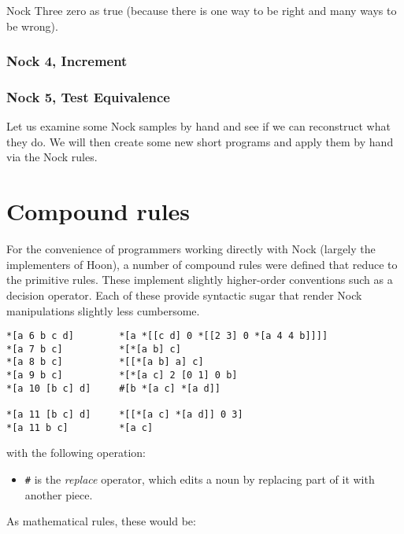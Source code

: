Nock Three
zero as true (because there is one way to be right and many ways to be wrong).

\subsubsection[Nock 4]{Nock 4, Increment}
\subsubsection[Nock 5]{Nock 5, Test Equivalence}

Let us examine some Nock samples by hand and see if we can reconstruct what they do.  We will then create some new short programs and apply them by hand via the Nock rules.


\section{Compound rules}

For the convenience of programmers working directly with Nock (largely the implementers of Hoon), a number of compound rules were defined that reduce to the primitive rules.  These implement slightly higher-order conventions such as a decision operator.  Each of these provide syntactic sugar that render Nock manipulations slightly less cumbersome.

\begin{lstlisting}[style=nonumbers]
*[a 6 b c d]        *[a *[[c d] 0 *[[2 3] 0 *[a 4 4 b]]]]
*[a 7 b c]          *[*[a b] c]
*[a 8 b c]          *[[*[a b] a] c]
*[a 9 b c]          *[*[a c] 2 [0 1] 0 b]
*[a 10 [b c] d]     #[b *[a c] *[a d]]

*[a 11 [b c] d]     *[[*[a c] *[a d]] 0 3]
*[a 11 b c]         *[a c]
\end{lstlisting}

with the following operation:

\begin{itemize}
  \item  \texttt{\#} is the \emph{replace} operator, which edits a noun by replacing part of it with another piece.
\end{itemize}

As mathematical rules, these would be:

